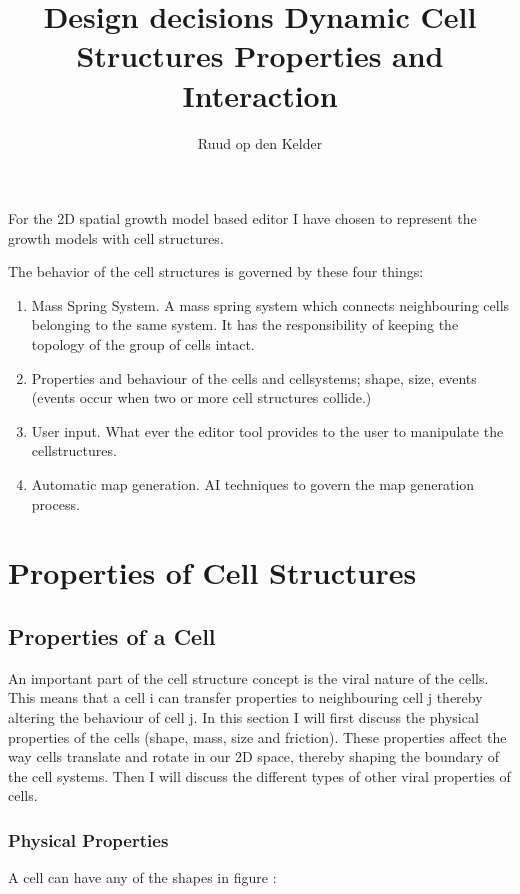 \documentclass{article}
\title{Design decisions Dynamic Cell Structures \small{Properties and Interaction}}
\author{Ruud op den Kelder}
\begin{document}
\maketitle

For the 2D spatial growth model based editor I have chosen to represent the growth models with cell structures. 

The behavior of the cell structures is governed by these four things:  

\begin{enumerate}
\item Mass Spring System. A mass spring system which connects neighbouring cells belonging to the same system. It has the responsibility of keeping the topology of the group of cells intact.  
\item Properties and behaviour of the cells and cellsystems; shape, size, events (events occur when two or more cell structures collide.) 
\item User input. What ever the editor tool provides to the user to manipulate the cellstructures.
\item Automatic map generation. AI techniques to govern the map generation process.  
\end{enumerate}  

\section{Properties of Cell Structures}

\subsection{Properties of a Cell}
 
An important part of the cell structure concept is the viral nature of the cells. This means that a cell i can transfer properties to neighbouring cell j thereby altering the behaviour of cell j. In this section I will first discuss the physical properties of the cells (shape, mass, size and friction). These properties affect the way cells translate and rotate in our 2D space, thereby shaping the boundary of the cell systems. Then I will discuss the different types of other viral properties of cells.    





\subsubsection{Physical Properties}
A cell can have any of the shapes in figure \label{fig: shapes}:
\end{document}
